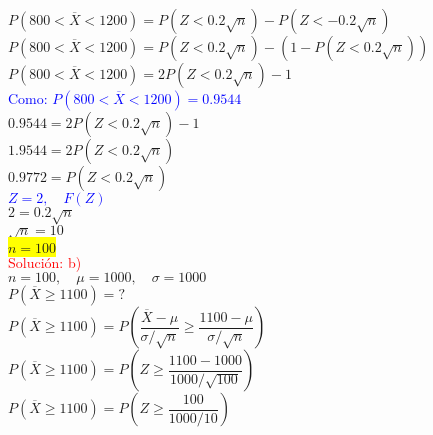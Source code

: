 \documentclass[DIV=calc,paper=a4,fontsize=11pt,openany]{book}
\begin{document}
$\textit{P}(800 < \overline{X} < 1200) = \textit{P}(\textit{Z} < 0.2\sqrt{\textit{n}}) - \textit{P}(\textit{Z} < -0.2\sqrt{\textit{n}})$\\

$\textit{P}(800 < \overline{X} < 1200) = \textit{P}(\textit{Z} < 0.2\sqrt{\textit{n}}) - (1 -\textit{P}(\textit{Z} < 0.2\sqrt{\textit{n}}))$\\

$\textit{P}(800 < \overline{X} < 1200) = 2\textit{P}(\textit{Z} < 0.2\sqrt{\textit{n}}) - 1 $\\

\textcolor{blue}{Como: $\textit{P}(800 < \overline{X} < 1200) = 0.9544$}\\

$0.9544 = 2\textit{P}(\textit{Z} < 0.2\sqrt{\textit{n}}) - 1 $\\

$1.9544 = 2\textit{P}(\textit{Z} < 0.2\sqrt{\textit{n}})$\\

$0.9772 = \textit{P}(\textit{Z} < 0.2\sqrt{\textit{n}})$\\

\textcolor{blue}{$\textit{Z} = 2, \quad F(\textit{Z})$}\\

$2 = 0.2\sqrt{\textit{n}}$\\

$\sqrt{\textit{n}} = 10$\\

\colorbox{yellow}{$\textit{n} = 100$}\\


\textcolor{red}{Solución: b)}\\

$\textit{n} = 100, \quad \mu = 1000, \quad \sigma = 1000 $\\

$\textit{P}(\overline{X} \geqslant 1100) = ?$\\

$\textit{P}(\overline{X} \geqslant 1100) = \textit{P}(\dfrac{\overline{X} - \mu}{\sigma/\sqrt{\textit{n}}} \geqslant \dfrac{1100 - \mu}{\sigma/\sqrt{\textit{n}}})$\\

$\textit{P}(\overline{X} \geqslant 1100) = \textit{P}(\textit{Z} \geqslant \dfrac{1100 - 1000}{1000/\sqrt{\textit{100}}})$\\

$\textit{P}(\overline{X} \geqslant 1100) = \textit{P}(\textit{Z} \geqslant \dfrac{100}{1000/10})$\\
\end{document}
